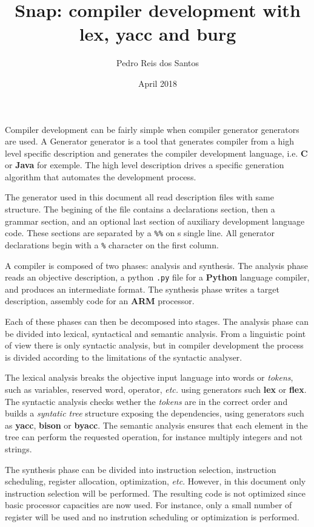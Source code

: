 \documentclass[a4paper]{article}
\title{Snap: compiler development with lex, yacc and burg}
\author{Pedro Reis dos Santos}
\date{April 2018}
\begin{document}
\maketitle

Compiler development can be fairly simple when compiler generator generators are used. A Generator generator is a tool that generates compiler from a high level specific description and generates the compiler development language, i.e. {\bf C} or {\bf Java} for exemple. The high level description drives a specific generation algorithm that automates the development process.

The generator used in this document all read description files with same structure. The begining of the file contains a declarations section, then a grammar section, and an optional last section of auxiliary development language code. These sections are separated by a {\tt \%\%} on s single line. All generator declarations begin with a {\tt \%} character on the first column.

A compiler is composed of two phases: analysis and synthesis. The analysis phase reads an objective description, a python {\tt .py} file for a {\bf Python} language compiler, and produces an intermediate format. The synthesis phase writes a target description, assembly code for an {\bf\sc ARM} processor.

Each of these phases can then be decomposed into stages.
The analysis phase can be divided into lexical, syntactical and semantic analysis. From a linguistic point of view there is only syntactic analysis, but in compiler development the process is divided according to the limitations of the syntactic analyser.

The lexical analysis breaks the objective input language into words or {\em tokens}, such as variables, reserved word, operator, {\it etc.} using generators such {\bf lex} or {\bf flex}.
The syntactic analysis checks wether the {\em tokens} are in the correct order and builds a {\em syntatic tree} structure exposing the dependencies, using generators such as {\bf yacc}, {\bf bison} or {\bf byacc}.
The semantic analysis ensures that each element in the tree can perform the requested operation, for instance multiply integers and not strings.

The synthesis phase can be divided into instruction selection, instruction scheduling, register allocation, optimization, {\it etc}. However, in this document only instruction selection will be performed. The resulting code is not optimized since basic processor capacities are now used. For instance, only a small number of register will be used and no instrution scheduling or optimization is performed.
\end{document}
